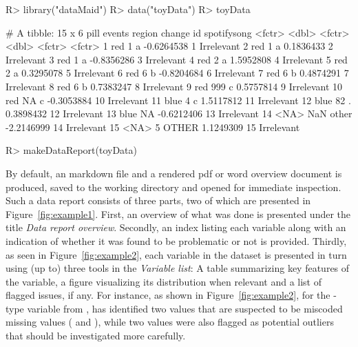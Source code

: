 \documentclass[article,shortnames]{jss}
\begin{document}
\begin{Schunk}
\begin{Sinput}
R> library("dataMaid")
R> data("toyData")
R> toyData
\end{Sinput}
\begin{Soutput}
# A tibble: 15 x 6
     pill events region     change     id spotifysong
   <fctr>  <dbl> <fctr>      <dbl> <fctr>      <fctr>
 1    red      1      a -0.6264538      1  Irrelevant
 2    red      1      a  0.1836433      2  Irrelevant
 3    red      1      a -0.8356286      3  Irrelevant
 4    red      2      a  1.5952808      4  Irrelevant
 5    red      2      a  0.3295078      5  Irrelevant
 6    red      6      b -0.8204684      6  Irrelevant
 7    red      6      b  0.4874291      7  Irrelevant
 8    red      6      b  0.7383247      8  Irrelevant
 9    red    999      c  0.5757814      9  Irrelevant
10    red     NA      c -0.3053884     10  Irrelevant
11   blue      4      c  1.5117812     11  Irrelevant
12   blue     82      .  0.3898432     12  Irrelevant
13   blue     NA        -0.6212406     13  Irrelevant
14   <NA>    NaN  other -2.2146999     14  Irrelevant
15   <NA>      5  OTHER  1.1249309     15  Irrelevant
\end{Soutput}
\end{Schunk}

\begin{Schunk}
\begin{Sinput}
R> makeDataReport(toyData)
\end{Sinput}
\end{Schunk}

By default, an  markdown file and a rendered pdf or word
overview document is produced, saved to the working directory and
opened for immediate inspection. Such a data report consists of three
parts, two of which are presented in Figure~\ref{fig:example1}. First,
an overview of what was done is presented under the title \textit{Data
  report overview}. Secondly, an index listing each variable along
with an indication of whether it was found to be problematic or not is
provided. Thirdly, as seen in Figure~\ref{fig:example2}, each variable
in the dataset is presented in turn using (up to) three tools in the
\textit{Variable list}: A table summarizing key features of the
variable, a figure visualizing its distribution when relevant and a list of flagged
issues, if any. For instance, as shown in Figure~\ref{fig:example2},
for the -type variable  from
,  has identified two values that
are suspected to be miscoded missing values ( and
), while two values were also flagged as potential outliers
that should be investigated more carefully.
\end{document}
